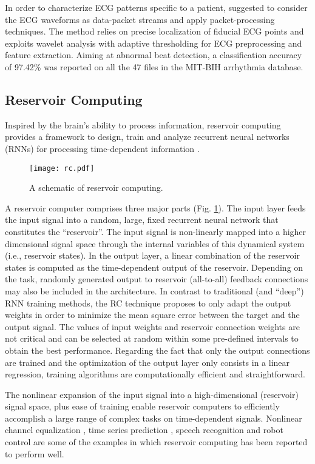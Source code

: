 \documentclass[review]{elsarticle}
\begin{document}
In order to characterize ECG patterns specific to a patient, \cite{faezipour2010patient} suggested to consider the ECG waveforms as data-packet streams and apply packet-processing techniques. The method relies on precise localization of fiducial ECG points and exploits wavelet analysis with adaptive thresholding for ECG preprocessing and feature extraction. Aiming at abnormal beat detection, a classification accuracy of 97.42\% was reported on all the 47 files in the MIT-BIH arrhythmia database. 

\subsection{Reservoir Computing}
Inspired by the brain’s ability to process information,
reservoir computing provides a framework to design, train and analyze recurrent neural networks (RNNs) for processing time-dependent information \cite{jaeger2001echo,maass2002real}.

\begin{figure}
\centering
\texttt{[image: rc.pdf]}
\caption{A schematic of reservoir computing.}
\label{fig_rc}
\end{figure}

A reservoir computer comprises three major parts 
(Fig. \ref{fig_rc}). The input layer feeds the input signal into a
random, large, fixed recurrent neural network that constitutes
the ``reservoir''. The input signal is non-linearly
mapped into a higher dimensional signal space through the internal
variables of this dynamical system (i.e., reservoir
states). In the output layer, a linear combination of the
reservoir states is computed as the time-dependent output
of the reservoir. Depending on the task, randomly
generated output to reservoir (all-to-all) feedback connections
may also be included in the architecture. In contrast to traditional (and ``deep'') RNN training methods, the RC
technique proposes to only adapt the output weights
in order to minimize the mean square error between
the target and the output signal. The values of input
weights and reservoir connection weights are not critical
and can be selected at random within some pre-defined
intervals to obtain the best performance. Regarding
the fact that only the output connections are trained
and the optimization of the output layer only consists
in a linear regression, training algorithms are computationally efficient and straightforward.

The nonlinear expansion of the input signal into a
high-dimensional (reservoir) signal space, plus ease of
training enable reservoir computers to efficiently accomplish
a large range of complex tasks on time-dependent
signals. Nonlinear channel equalization \cite{jaeger2004harnessing},
time series prediction \cite{jaeger2001echo,li2012chaotic}, speech recognition \cite{triefenbach2010phoneme} and robot control \cite{antonelo2008event} are some of the examples
in which reservoir computing has been reported to
perform well.
\end{document}
